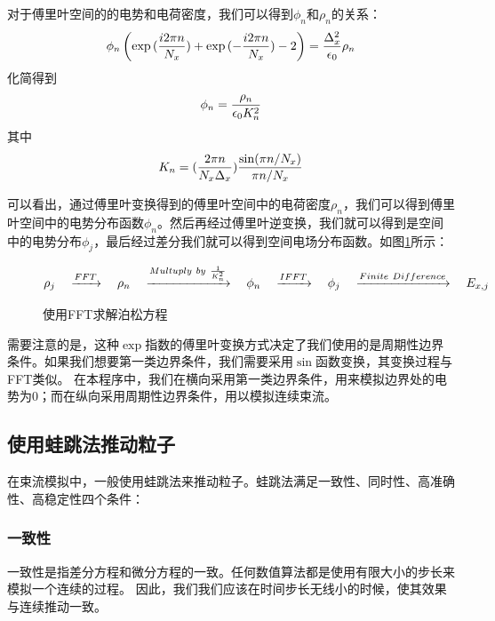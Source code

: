 {对于傅里叶空间的的电势和电荷密度，我们可以得到$\phi_{n}$和$\rho_{n}$的关系：
\begin{equation}\label{eq:FFT@PIC3}
\phi_{n}\left(\exp{(\frac{i2 \pi n}{N_x} )}  +  \exp{(-\frac{i2 \pi n}{N_x})} - 2 \right)
 = \frac{\Delta _{x}^{2}}{\epsilon _0} {\rho_n} \\
\end{equation}
化简得到
\begin{equation}\label{eq:FFT@PIC3_consice}
\phi_{n} = \frac{\rho_n}{\epsilon _0 K_n^2} \\
\end{equation}
其中
\begin{equation}\label{eq:FFT@PIC4}
K_n = (\frac{2\pi n}{N_x \Delta _x}) \frac{\sin({\pi n}/{N_x})}{{\pi n}/{N_x}} \\
\end{equation}

可以看出，通过傅里叶变换得到的傅里叶空间中的电荷密度$\rho_{n}$，我们可以得到傅里叶空间中的电势分布函数$\phi_{n}$。然后再经过傅里叶逆变换，我们就可以得到是空间中的电势分布$\phi_{j}$，最后经过差分我们就可以得到空间电场分布函数。如图\ref{fig:PIC_FFT_Poisson}所示：
\begin{figure}[ht]
  \begin{equation*}
    \centering
    \rho_j \quad \xrightarrow{FFT} \quad \rho_n  \quad \xrightarrow{Multuply\ by\ \frac{1}{K_n^2}}   \quad  \phi_n  \quad \xrightarrow{IFFT} \quad  \phi_j \quad \xrightarrow{Finite\ Difference} \quad  E_{x,j}
  \end{equation*}
  \caption{使用FFT求解泊松方程}
  \label{fig:PIC_FFT_Poisson}
\end{figure}

需要注意的是，这种$\exp$指数的傅里叶变换方式决定了我们使用的是周期性边界条件。如果我们想要第一类边界条件，我们需要采用$\sin$函数变换，其变换过程与FFT类似。
在本程序中，我们在横向采用第一类边界条件，用来模拟边界处的电势为0；而在纵向采用周期性边界条件，用以模拟连续束流。

\subsection{使用蛙跳法推动粒子}
在束流模拟中，一般使用蛙跳法来推动粒子。蛙跳法满足一致性、同时性、高准确性、高稳定性四个条件：

\subsubsection{一致性}
      一致性是指差分方程和微分方程的一致。任何数值算法都是使用有限大小的步长来模拟一个连续的过程。
      因此，我们我们应该在时间步长无线小的时候，使其效果与连续推动一致。

}
